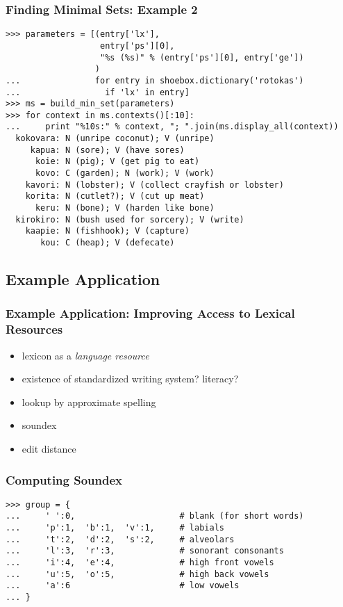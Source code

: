 \documentclass{beamer}             %
\begin{document}
\begin{frame}[fragile]
\frametitle{Finding Minimal Sets: Example 2}
\scriptsize

\begin{verbatim}
>>> parameters = [(entry['lx'],
                   entry['ps'][0],
                   "%s (%s)" % (entry['ps'][0], entry['ge'])
                  )
...               for entry in shoebox.dictionary('rotokas')
...                 if 'lx' in entry]
>>> ms = build_min_set(parameters)
>>> for context in ms.contexts()[:10]:
...     print "%10s:" % context, "; ".join(ms.display_all(context))
  kokovara: N (unripe coconut); V (unripe)
     kapua: N (sore); V (have sores)
      koie: N (pig); V (get pig to eat)
      kovo: C (garden); N (work); V (work)
    kavori: N (lobster); V (collect crayfish or lobster)
    korita: N (cutlet?); V (cut up meat)
      keru: N (bone); V (harden like bone)
  kirokiro: N (bush used for sorcery); V (write)
    kaapie: N (fishhook); V (capture)
       kou: C (heap); V (defecate)
\end{verbatim}
\end{frame}

\subsection{Example Application}

\begin{frame}
\frametitle{Example Application: Improving Access to Lexical Resources}
\begin{itemize}
\item lexicon as a \textit{language resource}
\item existence of standardized writing system?  literacy?
\item lookup by approximate spelling
\item soundex
\item edit distance
\end{itemize}
\end{frame}

\begin{frame}[fragile]
\frametitle{Computing Soundex}
\scriptsize

\begin{verbatim}
>>> group = {
...     ' ':0,                     # blank (for short words)
...     'p':1,  'b':1,  'v':1,     # labials
...     't':2,  'd':2,  's':2,     # alveolars
...     'l':3,  'r':3,             # sonorant consonants
...     'i':4,  'e':4,             # high front vowels
...     'u':5,  'o':5,             # high back vowels
...     'a':6                      # low vowels
... }
\end{verbatim}
\end{frame}
\end{document}
